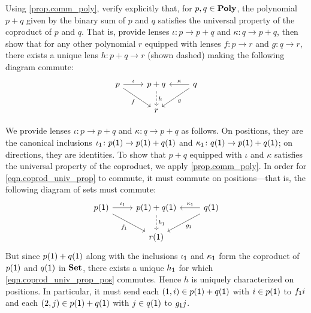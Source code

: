\documentclass[Book-Poly]{subfiles}
\begin{document}
\begin{exercise}
Using \cref{prop.comm_poly}, verify explicitly that, for $p, q \in \mathbf{Poly}$, the polynomial $p+q$ given by the binary sum of $p$ and $q$ satisfies the universal property of the coproduct of $p$ and $q$.
That is, provide lenses $\iota \colon p \to p + q$ and $\kappa \colon q \to p + q$, then show that for any other polynomial $r$ equipped with lenses $f \colon p \to r$ and $g \colon q \to r$, there exists a unique lens $h\colon p+q\to r$ (shown dashed) making the following diagram commute:
\begin{equation} \label{eqn.coprod_univ_prop}
\begin{tikzcd}
	p \ar[r, "\iota"] \ar[dr, "f"'] &
	p + q \ar[d, "h", dashed] &
	q \ar[l, "\kappa"'] \ar[dl, "g"] \\
	& r
\end{tikzcd}
\end{equation}
\begin{solution}
We provide lenses $\iota\colon p\to p+q$ and $\kappa\colon q\to p+q$ as follows.
On positions, they are the canonical inclusions $\iota_{\textsf{1}}\colon p(\textsf{1})\to p(\textsf{1})+q(\textsf{1})$ and $\kappa_{\textsf{1}}\colon q(\textsf{1})\to p(\textsf{1})+q(\textsf{1})$; on directions, they are identities.
To show that $p+q$ equipped with $\iota$ and $\kappa$ satisfies the universal property of the coproduct, we apply \cref{prop.comm_poly}.
In order for \eqref{eqn.coprod_univ_prop} to commute, it must commute on positions---that is, the following diagram of sets must commute:
\begin{equation} \label{eqn.coprod_univ_prop_pos}
\begin{tikzcd}
	p(\1) \ar[r, "\iota_\1"] \ar[dr, "f_\1"'] &
	p(\1) + q(\1) \ar[d, "h_\1", dashed] &
	q(\1) \ar[l, "\kappa_\1"'] \ar[dl, "g_\1"] \\
	& r(\1)
\end{tikzcd}
\end{equation}
But since $p(1)+q(\textsf{1})$ along with the inclusions $\iota_{\textsf{1}}$ and $\kappa_{\textsf{1}}$ form the coproduct of $p(\textsf{1})$ and $q(\textsf{1})$ in $\mathbf{Set}$, there exists a unique $h_{\textsf{1}}$ for which \eqref{eqn.coprod_univ_prop_pos} commutes.
Hence $h$ is uniquely characterized on positions.
In particular, it must send each $(1,i) \in p(\textsf{1})+q(\textsf{1})$ with $i \in p(\textsf{1})$ to $f_{\textsf{1}}i$ and each $(2,j) \in p(\textsf{1})+q(\textsf{1})$ with $j \in q(\textsf{1})$ to $g_{\textsf{1}}j$.


\end{solution}
\end{exercise}
\end{document}

